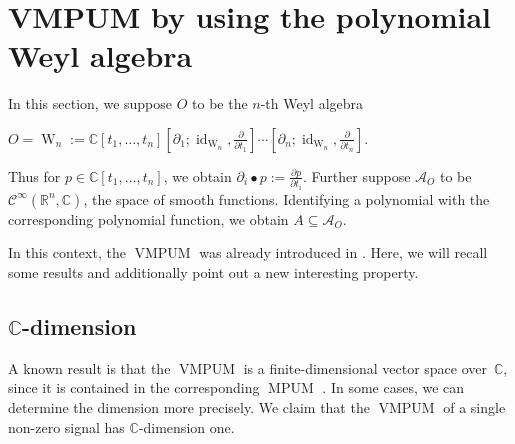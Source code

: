 \documentclass[a4paper,10pt]{article}
\theoremstyle{nonumberplain}
\newcommand{\R}{\mathbb{R}}
\newcommand{\C}{\mathbb{C}}
\DeclareMathOperator{\W}{W}
\DeclareMathOperator{\id}{id}
\DeclareMathOperator{\MPUM}{MPUM}
\DeclareMathOperator{\VMPUM}{VMPUM}
\begin{document}
\section{VMPUM by using the polynomial Weyl algebra}

In this section, we suppose $O$ to be the $n$-th Weyl algebra 
\begin{center}
$O = \W_n:= \C[t_1, \dots, t_n][ \partial_1; \id_{ \W_n}, \frac{\partial}{\partial t_1}] 
\cdots [ \partial_n; \id_{ \W_n}, \frac{\partial}{\partial t_n}].$
\end{center}
Thus for $p \in\C[t_1, \dots, t_n]$, we obtain $ \partial_i \bullet p := \frac{\partial p}{\partial t_i}$.
Further suppose $\mathcal{A}_O $ to be $\mathcal{C}^\infty(\R^n,\C)$, the space of 
smooth functions. Identifying a polynomial with the corresponding polynomial function, we
obtain $A \subseteq \mathcal{A}_O$.

In this context, the $\VMPUM$ was already introduced in \cite{VMPUM}. 
Here, we will recall some results and additionally 
point out a new interesting property. 

\subsection{$\C$-dimension}
A known result is that the $\VMPUM$ is a finite-dimensional
vector space over~$\C$, since it is contained in the 
corresponding $\MPUM$ \cite{VMPUM}.
In some cases, we can determine the dimension more precisely. 
We claim that the $\VMPUM$ of
a single non-zero signal has $\C$-dimension one.
\end{document}
